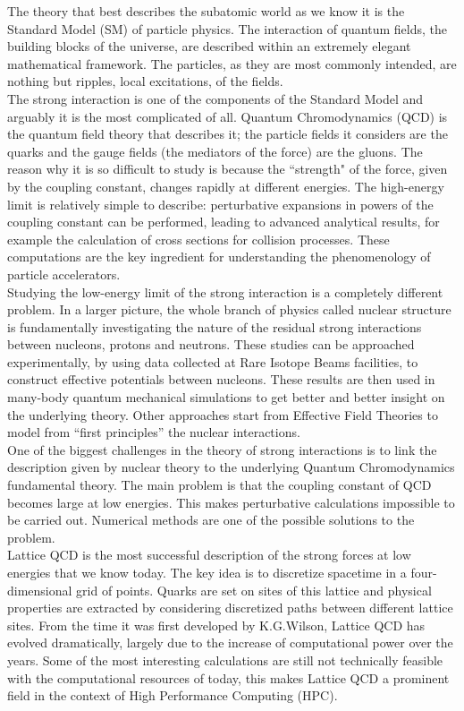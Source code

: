 The theory that best describes the subatomic world as we know it is the Standard Model (SM) of particle physics. The interaction of quantum fields, the building blocks of the universe, are described within an extremely elegant mathematical framework. The particles, as they are most commonly intended, are nothing but ripples, local excitations, of the fields.\\
The strong interaction is one of the components of the Standard Model and arguably it is the most complicated of all. Quantum Chromodynamics (QCD) is the quantum field theory that describes it; the particle fields it considers are the quarks and the gauge fields (the mediators of the force) are the gluons. The reason why it is so difficult to study is because the ``strength" of the force, given by the coupling constant, changes rapidly at different energies. The high-energy limit is relatively simple to describe: perturbative expansions in powers of the coupling constant can be performed, leading to advanced analytical results, for example the calculation of cross sections for collision processes. These computations are the key ingredient for understanding the phenomenology of particle accelerators.\\
Studying the low-energy limit of the strong interaction is a completely different problem. In a larger picture, the whole branch of physics called nuclear structure is fundamentally investigating the nature of the residual strong interactions between nucleons, protons and neutrons. These studies can be approached experimentally, by using data collected at Rare Isotope Beams facilities, to construct effective potentials between nucleons. These results are then used in many-body quantum mechanical simulations to get better and better insight on the underlying theory. Other approaches start from Effective Field Theories to model from ``first principles'' the nuclear interactions.\\
One of the biggest challenges in the theory of strong interactions is to link the description given by nuclear theory to the underlying Quantum Chromodynamics fundamental theory. The main problem is that the coupling constant of QCD becomes large at low energies. This makes perturbative calculations impossible to be carried out. Numerical methods are one of the possible solutions to the problem.\\

Lattice QCD is the most successful description of the strong forces at low energies that we know today. The key idea is to discretize spacetime in a four-dimensional grid of points. Quarks are set on sites of this lattice and physical properties are extracted by considering discretized paths between different lattice sites. From the time it was first developed by K.G.Wilson, Lattice QCD has evolved dramatically, largely due to the increase of computational power over the years. Some of the most interesting calculations are still not technically feasible with the computational resources of today, this makes Lattice QCD a prominent field in the context of High Performance Computing (HPC). \\

